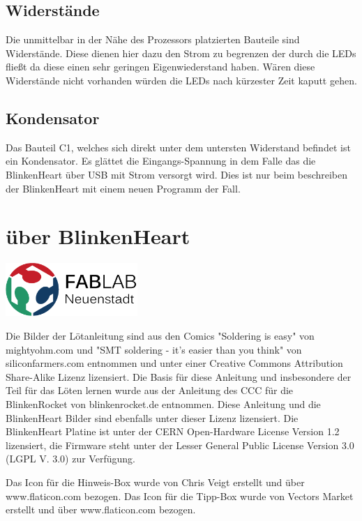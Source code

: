 \documentclass{book} %
\begin{document}
\subsection{Widerstände}
Die unmittelbar in der Nähe des Prozessors platzierten Bauteile sind Widerstände. Diese dienen hier dazu den Strom zu begrenzen der durch die LEDs fließt da diese einen sehr geringen Eigenwiederstand haben. Wären diese Widerstände nicht vorhanden würden die LEDs nach kürzester Zeit kaputt gehen.

\subsection{Kondensator}
Das Bauteil C1, welches sich direkt unter dem untersten Widerstand befindet ist ein Kondensator. Es glättet die Eingangs-Spannung in dem Falle das die BlinkenHeart über USB mit Strom versorgt wird. Dies ist nur beim beschreiben der BlinkenHeart mit einem neuen Programm der Fall.

\newpage
\section{über BlinkenHeart}
\begin{center}
	\includegraphics[width=5cm]{logo}
\end{center}
Die Bilder der Lötanleitung sind aus den Comics "Soldering is easy" von mightyohm.com und
"SMT soldering - it's easier than you think" von siliconfarmers.com entnommen und unter einer
Creative Commons Attribution Share-Alike Lizenz lizensiert.
Die Basis für diese Anleitung
und insbesondere der Teil für das Löten lernen wurde aus der Anleitung des CCC für die BlinkenRocket
von blinkenrocket.de entnommen.
Diese Anleitung und die BlinkenHeart Bilder sind ebenfalls unter dieser Lizenz lizensiert.
Die BlinkenHeart Platine ist unter der CERN Open-Hardware License Version 1.2 lizensiert, die Firmware steht unter der Lesser General
Public License Version 3.0 (LGPL V. 3.0) zur Verfügung.

Das Icon für die Hinweis-Box wurde von Chris Veigt erstellt und über www.flaticon.com bezogen.
Das Icon für die Tipp-Box wurde von Vectors Market erstellt und über www.flaticon.com bezogen.
\end{document}
